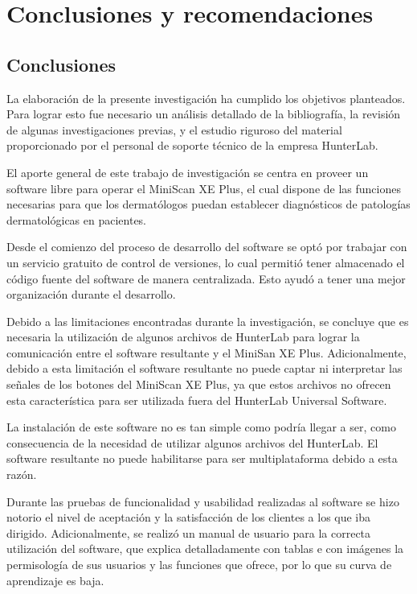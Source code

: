 \chapter{Conclusiones y recomendaciones}

\section{Conclusiones}

	La elaboraci\'{o}n de la presente investigaci\'{o}n ha cumplido los objetivos planteados. Para lograr esto fue necesario un an\'{a}lisis detallado de la bibliograf\'{i}a, la revisi\'{o}n de algunas investigaciones previas, y el estudio riguroso del material proporcionado por el personal de soporte t\'{e}cnico de la empresa HunterLab.
	
	El aporte general de este trabajo de investigaci\'{o}n se centra en proveer un software libre para operar el MiniScan XE Plus, el cual dispone de las funciones necesarias para que los dermat\'{o}logos puedan establecer diagn\'{o}sticos de patolog\'{i}as dermatol\'{o}gicas en pacientes.
	
	Desde el comienzo del proceso de desarrollo del software se opt\'{o} por trabajar con un servicio gratuito de control de versiones, lo cual permiti\'{o} tener almacenado el c\'{o}digo fuente del software de manera centralizada. Esto ayud\'{o} a tener una mejor organizaci\'{o}n durante el desarrollo.
	
	Debido a las limitaciones encontradas durante la investigaci\'{o}n, se concluye que es necesaria la utilizaci\'{o}n de algunos archivos de HunterLab para lograr la comunicaci\'{o}n entre el software resultante y el MiniSan XE Plus. Adicionalmente, debido a esta limitaci\'{o}n el software resultante no puede captar ni interpretar las se\~{n}ales de los botones del MiniScan XE Plus, ya que estos archivos no ofrecen esta caracter\'{i}stica para ser utilizada fuera del HunterLab Universal Software.
	
	La instalaci\'{o}n de este software no es tan simple como podr\'{i}a llegar a ser, como consecuencia de la necesidad de utilizar algunos archivos del HunterLab. El software resultante no puede habilitarse para ser multiplataforma debido a esta raz\'{o}n.

	Durante las pruebas de funcionalidad y usabilidad realizadas al software se hizo notorio el nivel de aceptaci\'{o}n y la satisfacci\'{o}n de los clientes a los que iba dirigido. Adicionalmente, se realiz\'{o} un manual de usuario para la correcta utilizaci\'{o}n del software, que explica detalladamente con tablas e con im\'{a}genes la permisolog\'{i}a de sus usuarios y las funciones que ofrece, por lo que su curva de aprendizaje es baja.

